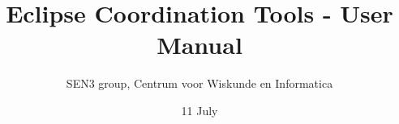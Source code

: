 \documentclass[runningheads]{llncs}
\begin{document}
\mainmatter
\pagestyle{empty}

\title{Eclipse Coordination Tools - User Manual}
\author{SEN3 group, Centrum voor Wiskunde en Informatica}
\date{11 July}



\maketitle

\tableofcontents








\end{document}
